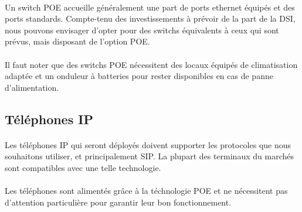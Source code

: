 \paragraph{} Un switch POE accueille généralement une part de ports ethernet
équipés et des ports standards. Compte-tenu des investissements à prévoir de la
part de la DSI, nous pouvons envisager d'opter pour des switchs équivalents à
ceux qui sont prévus, mais disposant de l'option POE.

\paragraph{} Il faut noter que des switchs POE nécessitent des locaux équipés de
climatisation adaptée et un onduleur à batteries pour rester disponibles en cas
de panne d'alimentation.

\subsection{Téléphones IP}

\paragraph{} Les téléphones IP qui seront déployés doivent supporter les
protocoles que nous souhaitons utiliser, et principalement \ac{SIP}. La plupart
des terminaux du marchés sont compatibles avec une telle technologie.

\paragraph{} Les téléphones sont alimentés grâce à la téchnologie \ac{POE} et ne
nécessitent pas d'attention particulière pour garantir leur bon fonctionnement.
